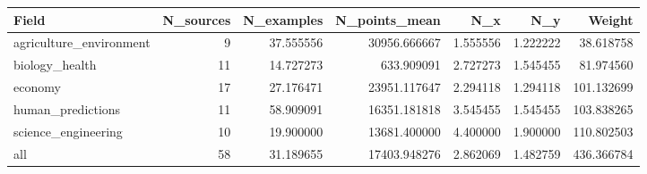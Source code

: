 \begin{tabular}{lrrrrrr}
\toprule
Field & N\_sources & N\_examples & N\_points\_mean & N\_x & N\_y & Weight \\
\midrule
agriculture\_environment & 9 & 37.555556 & 30956.666667 & 1.555556 & 1.222222 & 38.618758 \\
biology\_health & 11 & 14.727273 & 633.909091 & 2.727273 & 1.545455 & 81.974560 \\
economy & 17 & 27.176471 & 23951.117647 & 2.294118 & 1.294118 & 101.132699 \\
human\_predictions & 11 & 58.909091 & 16351.181818 & 3.545455 & 1.545455 & 103.838265 \\
science\_engineering & 10 & 19.900000 & 13681.400000 & 4.400000 & 1.900000 & 110.802503 \\
all & 58 & 31.189655 & 17403.948276 & 2.862069 & 1.482759 & 436.366784 \\
\bottomrule
\end{tabular}

